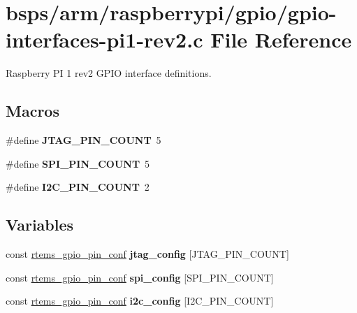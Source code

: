 \hypertarget{gpio-interfaces-pi1-rev2_8c}{}\section{bsps/arm/raspberrypi/gpio/gpio-\/interfaces-\/pi1-\/rev2.c File Reference}
\label{gpio-interfaces-pi1-rev2_8c}


Raspberry PI 1 rev2 G\+P\+IO interface definitions.  


\subsection*{Macros}
\begin{DoxyCompactItemize}
\item 
\mbox{\label{gpio-interfaces-pi1-rev2_8c_aa4b703cf71eac385ed9a72af20c4fba4}} 
\#define {\bfseries J\+T\+A\+G\+\_\+\+P\+I\+N\+\_\+\+C\+O\+U\+NT}~5
\item 
\mbox{\label{gpio-interfaces-pi1-rev2_8c_aa4d94b936f789c008c3dcfbbdb62057d}} 
\#define {\bfseries S\+P\+I\+\_\+\+P\+I\+N\+\_\+\+C\+O\+U\+NT}~5
\item 
\mbox{\label{gpio-interfaces-pi1-rev2_8c_aa0597b7f4bfff9ac317dad20f2554613}} 
\#define {\bfseries I2\+C\+\_\+\+P\+I\+N\+\_\+\+C\+O\+U\+NT}~2
\end{DoxyCompactItemize}
\subsection*{Variables}
\begin{DoxyCompactItemize}
\item 
\mbox{\label{gpio-interfaces-pi1-rev2_8c_af7f77b66faf96c298e19894e4268aed2}} 
const \mbox{\hyperlink{structrtems__gpio__pin__conf}{rtems\+\_\+gpio\+\_\+pin\+\_\+conf}} {\bfseries jtag\+\_\+config} \mbox{[}J\+T\+A\+G\+\_\+\+P\+I\+N\+\_\+\+C\+O\+U\+NT\mbox{]}
\item 
\mbox{\label{gpio-interfaces-pi1-rev2_8c_a288cc4b8a16cd35a3e2e9d7803328055}} 
const \mbox{\hyperlink{structrtems__gpio__pin__conf}{rtems\+\_\+gpio\+\_\+pin\+\_\+conf}} {\bfseries spi\+\_\+config} \mbox{[}S\+P\+I\+\_\+\+P\+I\+N\+\_\+\+C\+O\+U\+NT\mbox{]}
\item 
const \mbox{\hyperlink{structrtems__gpio__pin__conf}{rtems\+\_\+gpio\+\_\+pin\+\_\+conf}} {\bfseries i2c\+\_\+config} \mbox{[}I2\+C\+\_\+\+P\+I\+N\+\_\+\+C\+O\+U\+NT\mbox{]}
\end{DoxyCompactItemize}



